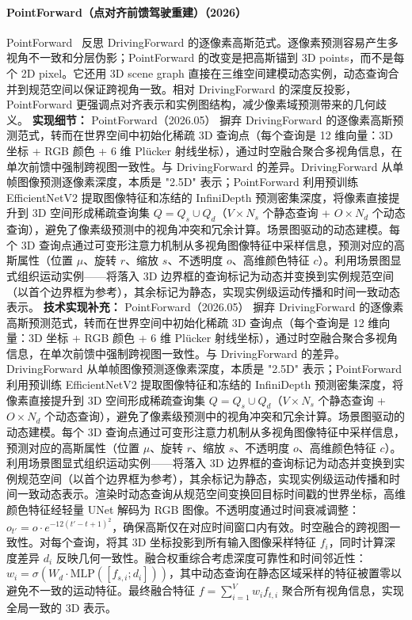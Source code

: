 \paragraph{PointForward（点对齐前馈驾驶重建）（2026）}
PointForward~\cite{2605_11594} 反思 DrivingForward 的逐像素高斯范式。逐像素预测容易产生多视角不一致和分层伪影；PointForward 的改变是把高斯锚到 3D points，而不是每个 2D pixel。它还用 3D scene graph 直接在三维空间建模动态实例，动态查询合并到规范空间以保证跨视角一致。相对 DrivingForward 的深度反投影，PointForward 更强调点对齐表示和实例图结构，减少像素域预测带来的几何歧义。
\textbf{实现细节：} PointForward（2026.05） 摒弃 DrivingForward 的逐像素高斯预测范式，转而在世界空间中初始化稀疏 3D 查询点（每个查询是 12 维向量：3D 坐标 + RGB 颜色 + 6 维 Pl\"ucker 射线坐标），通过时空融合聚合多视角信息，在单次前馈中强制跨视图一致性。与 DrivingForward 的差异。DrivingForward 从单帧图像预测逐像素深度，本质是 "2.5D" 表示；PointForward 利用预训练 EfficientNetV2 提取图像特征和冻结的 InfiniDepth 预测密集深度，将像素直接提升到 3D 空间形成稀疏查询集 $Q = Q_s \cup Q_d$（$V \times N_s$ 个静态查询 + $O \times N_d$ 个动态查询），避免了像素级预测中的视角冲突和冗余计算。场景图驱动的动态建模。每个 3D 查询点通过可变形注意力机制从多视角图像特征中采样信息，预测对应的高斯属性（位置 $\mu$、旋转 $r$、缩放 $s$、不透明度 $o$、高维颜色特征 $c$）。利用场景图显式组织运动实例——将落入 3D 边界框的查询标记为动态并变换到实例规范空间（以首个边界框为参考），其余标记为静态，实现实例级运动传播和时间一致动态表示。
\textbf{技术实现补充：} PointForward（2026.05） 摒弃 DrivingForward 的逐像素高斯预测范式，转而在世界空间中初始化稀疏 3D 查询点（每个查询是 12 维向量：3D 坐标 + RGB 颜色 + 6 维 Pl\"ucker 射线坐标），通过时空融合聚合多视角信息，在单次前馈中强制跨视图一致性。与 DrivingForward 的差异。DrivingForward 从单帧图像预测逐像素深度，本质是 "2.5D" 表示；PointForward 利用预训练 EfficientNetV2 提取图像特征和冻结的 InfiniDepth 预测密集深度，将像素直接提升到 3D 空间形成稀疏查询集 $Q = Q_s \cup Q_d$（$V \times N_s$ 个静态查询 + $O \times N_d$ 个动态查询），避免了像素级预测中的视角冲突和冗余计算。场景图驱动的动态建模。每个 3D 查询点通过可变形注意力机制从多视角图像特征中采样信息，预测对应的高斯属性（位置 $\mu$、旋转 $r$、缩放 $s$、不透明度 $o$、高维颜色特征 $c$）。利用场景图显式组织运动实例——将落入 3D 边界框的查询标记为动态并变换到实例规范空间（以首个边界框为参考），其余标记为静态，实现实例级运动传播和时间一致动态表示。渲染时动态查询从规范空间变换回目标时间戳的世界坐标，高维颜色特征经轻量 UNet 解码为 RGB 图像。不透明度通过时间衰减调整：$o_{t'} = o \cdot e^{-12(t'-t+1)^2}$，确保高斯仅在对应时间窗口内有效。时空融合的跨视图一致性。对每个查询，将其 3D 坐标投影到所有输入图像采样特征 $f_i$，同时计算深度差异 $d_i$ 反映几何一致性。融合权重综合考虑深度可靠性和时间邻近性：$w_i = \sigma(W_d \cdot \mathrm{MLP}([f_{s,i}; d_i]))$，其中动态查询在静态区域采样的特征被置零以避免不一致的运动特征。最终融合特征 $f = \sum_{i=1}^{V} w_i f_{t,i}$ 聚合所有视角信息，实现全局一致的 3D 表示。
